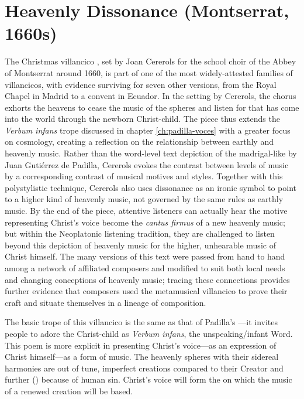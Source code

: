 % 
% 
%

\chapter{Heavenly Dissonance (Montserrat, 1660s)}
\label{ch:cererols-suspended}

The Christmas villancico , set by
Joan Cererols for the school choir of the Abbey of Montserrat around 1660, is
part of one of the most widely-attested families of villancicos, with evidence
surviving for seven other versions, from the Royal Chapel in Madrid to a convent
in Ecuador.
In the setting by Cererols, the chorus exhorts the heavens to cease the music of
the spheres and listen for  that has come into the
world through the newborn Christ-child.
The piece thus extends the \emph{Verbum infans} trope discussed in chapter
\ref{ch:padilla-voces} with a greater focus on cosmology, creating a reflection
on the relationship between earthly and heavenly music.
Rather than the word-level text depiction of the madrigal-like  by
Juan Gutiérrez de Padilla, Cererols evokes the contrast between levels of music
by a corresponding contrast of musical motives and styles.
Together with this polystylistic technique, Cererols also uses dissonance as an
ironic symbol to point to a higher kind of heavenly music, not governed by the
same rules as earthly music.
By the end of the piece, attentive listeners can actually hear the motive
representing Christ's voice become the \emph{cantus firmus} of a new heavenly
music; but within the Neoplatonic listening tradition, they are challenged to
listen beyond this depiction of heavenly music for the higher, unhearable music
of Christ himself.
The many versions of this text were passed from hand to hand among a network of
affiliated composers and modified to suit both local needs and changing
conceptions of heavenly music; tracing these connections provides further
evidence that composers used the metamusical villancico to prove their craft and
situate themselves in a lineage of composition.

The basic trope of this villancico is the same as that of Padilla's
---it invites people to adore the Christ-child
as \emph{Verbum infans}, the unspeaking/infant Word.
This poem is more explicit in presenting Christ's voice---as an expression of
Christ himself---as a form of music.
The heavenly spheres with their sidereal harmonies are out of tune, imperfect
creations compared to their Creator and further 
() because of human sin.
Christ's voice will form the  on which the music of a
renewed creation will be based.

